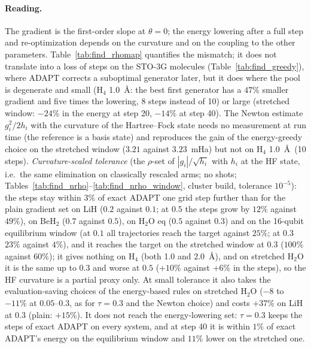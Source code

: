 \documentclass[11pt]{article}
\begin{document}
\paragraph{Reading.} The gradient is the first-order slope at $\theta=0$; the energy lowering after a full step and re-optimization depends on the curvature and on the coupling to the other parameters. Table~\ref{tab:find_rhomap} quantifies the mismatch; it does not translate into a loss of steps on the STO-3G molecules (Table~\ref{tab:find_greedy}), where ADAPT corrects a suboptimal generator later, but it does where the pool is degenerate and small (H$_4$ 1.0~\AA:
the best first generator has a $47\%$ smaller gradient and five times the lowering, 8 steps instead of 10) or large (stretched window: $-24\%$ in the energy at step 20, $-14\%$ at step 40). The Newton estimate $g_i^2/2h_i$ with the curvature of the Hartree--Fock state needs no measurement at run time (the reference is a basis state) and reproduces the gain
of the energy-greedy choice on the stretched window ($3.21$ against $3.23$~mHa) but not on H$_4$ 1.0~\AA\ (10 steps). \emph{Curvature-scaled tolerance} (the $\rho$-set of $|g_i|/\sqrt{h_i}$ with $h_i$ at the HF state, i.e.\ the same elimination on classically rescaled arms; no shots; Tables~\ref{tab:find_nrho}--\ref{tab:find_nrho_window}, cluster build, tolerance $10^{-5}$): the steps stay within $3\%$ of exact ADAPT one grid step further than for the plain gradient set on LiH ($0.2$ against $0.1$; at $0.5$ the steps grow by $12\%$ against $49\%$), on BeH$_2$ ($0.7$ against $0.5$), on H$_2$O eq ($0.5$ against $0.3$) and on the 16-qubit equilibrium window (at $0.1$ all trajectories reach the target against $25\%$; at $0.3$ $23\%$ against $4\%$), and it
reaches the target on the stretched window at $0.3$ ($100\%$ against $60\%$); it gives nothing on H$_4$ (both 1.0 and 2.0~\AA), and on stretched H$_2$O it is the same up to $0.3$ and worse at $0.5$ ($+10\%$ against $+6\%$ in the steps), so the HF curvature is a partial proxy only. At small tolerance it also takes the evaluation-saving choices of the energy-based rules on stretched H$_2$O ($-8$ to $-11\%$ at $0.05$--$0.3$, as for $\tau=0.3$ and the Newton choice) and costs $+37\%$ on LiH at $0.3$ (plain: $+15\%$). It does not reach the energy-lowering set: $\tau=0.3$ keeps the steps of exact ADAPT on every system, and at step 40 it is within $1\%$ of exact ADAPT's energy on the equilibrium window and $11\%$ lower on the stretched one.

\end{document}
